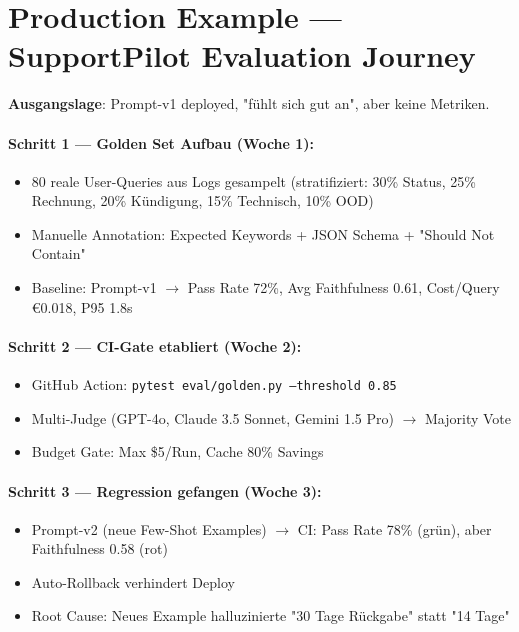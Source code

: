 \section{Production Example — SupportPilot Evaluation Journey}

\textbf{Ausgangslage}: Prompt-v1 deployed, "fühlt sich gut an", aber keine Metriken.

\paragraph{Schritt 1 — Golden Set Aufbau (Woche 1):}
\begin{itemize}
    \item 80 reale User-Queries aus Logs gesampelt (stratifiziert: 30\% Status, 25\% Rechnung, 20\% Kündigung, 15\% Technisch, 10\% OOD)
    \item Manuelle Annotation: Expected Keywords + JSON Schema + "Should Not Contain"
    \item Baseline: Prompt-v1 $\to$ Pass Rate 72\%, Avg Faithfulness 0.61, Cost/Query €0.018, P95 1.8s
\end{itemize}

\paragraph{Schritt 2 — CI-Gate etabliert (Woche 2):}
\begin{itemize}
    \item GitHub Action: \texttt{pytest eval/golden.py --threshold 0.85}
    \item Multi-Judge (GPT-4o, Claude 3.5 Sonnet, Gemini 1.5 Pro) $\to$ Majority Vote
    \item Budget Gate: Max \$5/Run, Cache 80\% Savings
\end{itemize}

\paragraph{Schritt 3 — Regression gefangen (Woche 3):}
\begin{itemize}
    \item Prompt-v2 (neue Few-Shot Examples) $\to$ CI: Pass Rate 78\% (grün), aber Faithfulness 0.58 (rot)
    \item Auto-Rollback verhindert Deploy
    \item Root Cause: Neues Example halluzinierte "30 Tage Rückgabe" statt "14 Tage"
\end{itemize}

